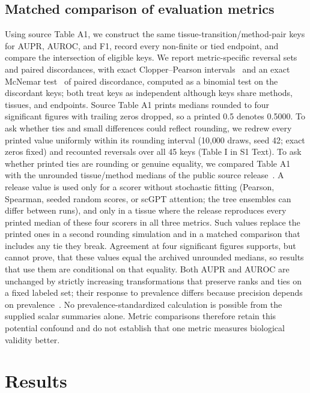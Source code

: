 \documentclass[10pt,letterpaper]{article}
\begin{document}
\subsection*{Matched comparison of evaluation metrics}
Using source Table A1, we construct the same tissue-transition/method-pair keys for AUPR, AUROC, and F1, record every non-finite or tied endpoint, and compare the intersection of eligible keys. We report metric-specific reversal sets and paired discordances, with exact Clopper--Pearson intervals~\cite{clopper1934binomial} and an exact McNemar test~\cite{mcnemar1947} of paired discordance, computed as a binomial test on the discordant keys; both treat keys as independent although keys share methods, tissues, and endpoints. Source Table A1 prints medians rounded to four significant figures with trailing zeros dropped, so a printed 0.5 denotes 0.5000. To ask whether ties and small differences could reflect rounding, we redrew every printed value uniformly within its rounding interval (10{,}000 draws, seed 42; exact zeros fixed) and recounted reversals over all 45 keys (Table I in S1 Text). To ask whether printed ties are rounding or genuine equality, we compared Table A1 with the unrounded tissue/method medians of the public source release~\cite{kendiukhov2026evalrelease}. A release value is used only for a scorer without stochastic fitting (Pearson, Spearman, seeded random scores, or scGPT attention; the tree ensembles can differ between runs), and only in a tissue where the release reproduces every printed median of these four scorers in all three metrics. Such values replace the printed ones in a second rounding simulation and in a matched comparison that includes any tie they break. Agreement at four significant figures supports, but cannot prove, that these values equal the archived unrounded medians, so results that use them are conditional on that equality. Both AUPR and AUROC are unchanged by strictly increasing transformations that preserve ranks and ties on a fixed labeled set; their response to prevalence differs because precision depends on prevalence~\cite{davis2006relationship,saito2015precision}. No prevalence-standardized calculation is possible from the supplied scalar summaries alone. Metric comparisons therefore retain this potential confound and do not establish that one metric measures biological validity better.

\section*{Results}
\end{document}
